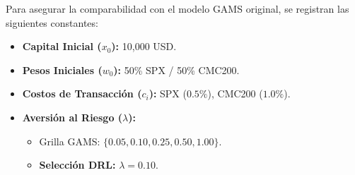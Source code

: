 \documentclass[11pt,a4paper]{article}
\begin{document}
Para asegurar la comparabilidad con el modelo GAMS original, se registran las siguientes constantes:

\begin{itemize}
    \item \textbf{Capital Inicial ($x_0$):} 10,000 USD.
    \item \textbf{Pesos Iniciales ($w_0$):} 50\% SPX / 50\% CMC200.
    \item \textbf{Costos de Transacción ($c_i$):} SPX ($0.5\%$), CMC200 ($1.0\%$).
    \item \textbf{Aversión al Riesgo ($\lambda$):}
    \begin{itemize}
        \item Grilla GAMS: $\{0.05, 0.10, 0.25, 0.50, 1.00\}$.
        \item \textbf{Selección DRL:} $\lambda = 0.10$.
    \end{itemize}
\end{itemize}
\end{document}
